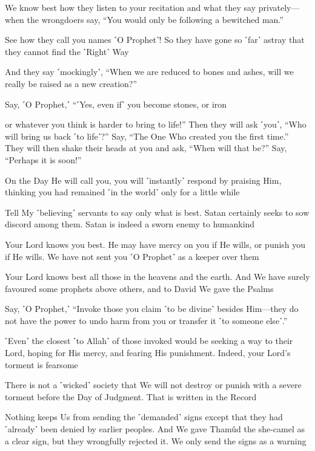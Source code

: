 We know best how they listen to your recitation and what they say privately—when the wrongdoers say, “You would only be following a bewitched man.”

See how they call you names ˹O Prophet˺! So they have gone so ˹far˺ astray that they cannot find the ˹Right˺ Way

And they say ˹mockingly˺, “When we are reduced to bones and ashes, will we really be raised as a new creation?”

Say, ˹O Prophet,˺ “˹Yes, even if˺ you become stones, or iron

or whatever you think is harder to bring to life!” Then they will ask ˹you˺, “Who will bring us back ˹to life˺?” Say, “The One Who created you the first time.” They will then shake their heads at you and ask, “When will that be?” Say, “Perhaps it is soon!”

On the Day He will call you, you will ˹instantly˺ respond by praising Him, thinking you had remained ˹in the world˺ only for a little while

Tell My ˹believing˺ servants to say only what is best. Satan certainly seeks to sow discord among them. Satan is indeed a sworn enemy to humankind

Your Lord knows you best. He may have mercy on you if He wills, or punish you if He wills. We have not sent you ˹O Prophet˺ as a keeper over them

Your Lord knows best all those in the heavens and the earth. And We have surely favoured some prophets above others, and to David We gave the Psalms

Say, ˹O Prophet,˺ “Invoke those you claim ˹to be divine˺ besides Him—they do not have the power to undo harm from you or transfer it ˹to someone else˺.”

˹Even˺ the closest ˹to Allah˺ of those invoked would be seeking a way to their Lord, hoping for His mercy, and fearing His punishment. Indeed, your Lord’s torment is fearsome

There is not a ˹wicked˺ society that We will not destroy or punish with a severe torment before the Day of Judgment. That is written in the Record

Nothing keeps Us from sending the ˹demanded˺ signs except that they had ˹already˺ been denied by earlier peoples. And We gave Thamûd the she-camel as a clear sign, but they wrongfully rejected it. We only send the signs as a warning

